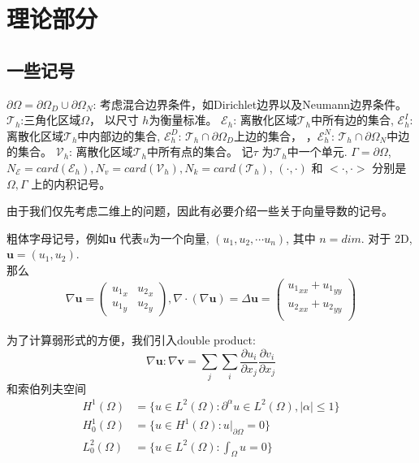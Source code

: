 \cleardoublepage

\section{理论部分}

\subsection{一些记号}
$\partial\Omega=\partial \Omega_D\cup\partial\Omega_N$: 考虑混合边界条件，如Dirichlet边界以及Neumann边界条件。 $\mathscr{T}_h$:三角化区域$\Omega$， 以尺寸 $h$为衡量标准。
$\mathscr{E}_h$:  离散化区域$\mathscr{T}_h$中所有边的集合, $\mathscr{E}_h^I$: 离散化区域$\mathscr{T}_h$中内部边的集合, $\mathscr{E}_h^D$: $\mathscr{T}_h\cap\partial\Omega_D $上边的集合， 
，$\mathscr{E}_h^N$: $\mathscr{T}_h\cap\partial\Omega_N $中边的集合。 
$\mathscr{V}_h$: 离散化区域$\mathscr{T}_h$中所有点的集合。
记$\tau$ 为$\mathscr{T}_h$中一个单元. $\Gamma=\partial \Omega$, 
$N_{\mathscr{E}}=card(\mathscr{E}_h),N_v=card(\mathscr{V}_h),N_k=card(\mathscr{T}_h)$, 
$(\cdot,\cdot)$ 和 $<\cdot, \cdot>$ 分别是 $\Omega, \Gamma$ 上的内积记号。


由于我们仅先考虑二维上的问题，因此有必要介绍一些关于向量导数的记号。

粗体字母记号，例如\textbf{u} 代表$u$为一个向量, $(u_1, u_2, \cdots u_n)$, 其中 $n=dim$. 对于 2D, $\textbf{u}=(u_1, u_2)$.\\
那么 $$\nabla \textbf{u}=\begin{pmatrix}
    {u_1}_x & {u_2}_x\\
    {u_1}_y & {u_2}_y
\end{pmatrix}, \nabla \cdot (\nabla \textbf{u})=\Delta \textbf{u}=\begin{pmatrix}
    {u_1}_{xx}+{u_1}_{yy}\\
    {u_2}_{xx}+{u_2}_{yy}\\
\end{pmatrix}$$

为了计算弱形式的方便，我们引入double product:
$$\nabla \textbf{u}:\nabla \textbf{v}=\sum_{j}\sum_{i}\frac{\partial u_i}{\partial x_j}\frac{\partial v_i}{\partial x_j}$$
和索伯列夫空间
$$\begin{aligned}
    H^1(\Omega)&=\{u\in L^2(\Omega):\partial^\alpha u\in L^2(\Omega),|\alpha|\leq 1\}\\
    H^1_0(\Omega)&=\{u\in H^1(\Omega): u|_{\partial \Omega}=0\}\\
    L^2_0(\Omega)&=\{u\in L^2(\Omega): \int_\Omega u=0\}
\end{aligned}$$

